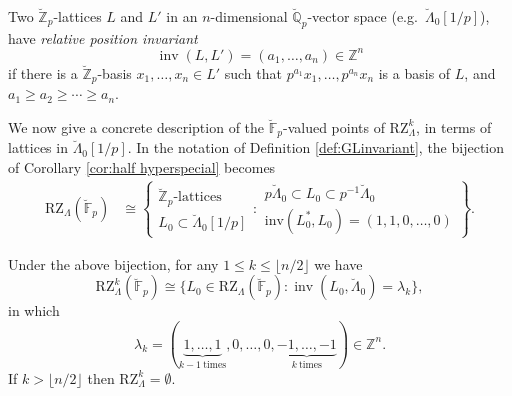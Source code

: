 \documentclass[11pt]{alggeom}
\newcommand{\iso}{\cong}
\newcommand{\Q}{\mathbb Q}
\newcommand{\Z}{\mathbb Z}
\newcommand{\F}{\mathbb F}
\DeclareMathOperator{\inv}{inv}
\begin{document}
\begin{definition}\label{def:GLinvariant}
Two $\breve{\Z}_p$-lattices $L$ and $L'$ in an $n$-dimensional $\breve{\Q}_p$-vector space (e.g.~$\breve{\Lambda}_0[1/p]$),  have \emph{relative position invariant} 
\[
\inv(L , L') = (a_1, \ldots, a_n)  \in   \Z^n
\]
if there is a  $\breve{\Z}_p$-basis $x_1,\ldots, x_n \in L'$ such that $p^{a_1} x_1 , \ldots, p^{a_n} x_n$  is a basis of $L$, and  $a_1 \ge a_2 \ge \cdots \ge a_n$.
\end{definition}



We now give a concrete description of the $\breve{\F}_p$-valued points of $\mathrm{RZ}_\Lambda^k$, in terms of lattices in $\breve{\Lambda}_0[1/p]$.
In  the notation of Definition \ref{def:GLinvariant},  the bijection of Corollary \ref{cor:half hyperspecial} becomes
\begin{align}\label{better half hyperspecial}
\mathrm{RZ}_\Lambda( \breve{\F}_p) 
 &  \iso
\left\{
\begin{array}{c}  \breve{\Z}_p\mbox{-lattices }   \\  L_0  \subset  \breve{\Lambda}_0[1/p]  \end{array} : 
\begin{array}{c}
  p  \breve{\Lambda}_0  \subset  L_0  \subset p^{-1} \breve{\Lambda}_0 \\
\mathrm{inv}(  L_0^*,   L_0) = (1,1,0, \ldots,0)  
  \end{array}  \right\} .
\end{align}



 \begin{proposition}\label{prop:strata points}
 Under the above bijection,  for any $1\le k \le \lfloor n/2\rfloor$ we have
    \[
\mathrm{RZ}_\Lambda^k( \breve{\F}_p) 
\iso  
\{ L_0  \in \mathrm{RZ}_\Lambda( \breve{\F}_p) : 
\inv(L_0 , \breve{\Lambda}_0) = \lambda_k \} ,
\]
in which 
\[
\lambda_k=( \underbrace{1,\ldots, 1}_{k-1\mathrm{\ times}}, 0,\ldots, 0 , \underbrace{-1,\ldots, -1}_{k\mathrm{\ times}} ) \in \Z^n.
\]
If $k>\lfloor n/2\rfloor$ then $\mathrm{RZ}_\Lambda^k = \emptyset$.
\end{proposition}
\end{document}
